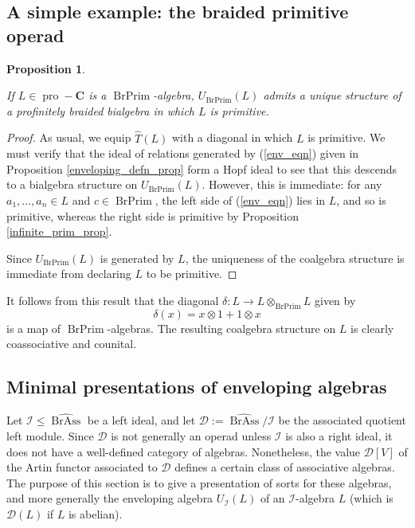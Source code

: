 \documentclass[12pt]{article}
\DeclareMathOperator{\pro}{pro}
\DeclareMathOperator{\BrAss}{BrAss}
\DeclareMathOperator{\BrPrim}{BrPrim}
\newcommand{\BrAsshat}{\widehat{\BrAss}} %
\newcommand{\That}{\widehat{T}}
\newcommand{\DD} {\mathcal{D}}
\newcommand{\bC} {\mathbf{C}}
\newcommand{\proC}{\pro\!-\bC}
\newcommand{\II}{\mathcal{I}}
\theoremstyle{plain}
\newtheorem{prop}[thm]{Proposition}
\theoremstyle{definition}
\theoremstyle{remark}
\begin{document}
\subsection{A simple example: the braided primitive operad}

\begin{prop} \label{universal_primitive_prop} 

If $L \in \proC$ is a $\BrPrim$-algebra, $U_{\BrPrim}(L)$ admits a unique structure of a profinitely braided bialgebra in which $L$ is primitive.  

\end{prop}

\begin{proof}

As usual, we equip $\That(L)$ with a diagonal in which $L$ is primitive.  We must verify that the ideal of relations generated by (\ref{env_eqn}) given in Proposition \ref{enveloping_defn_prop} form a Hopf ideal to see that this descends to a bialgebra structure on $U_{\BrPrim}(L)$.  However, this is immediate: for any $a_1, \dots, a_n \in L$ and $c \in \BrPrim$, the left side of (\ref{env_eqn}) lies in $L$, and so is primitive, whereas the right side is primitive by Proposition \ref{infinite_prim_prop}.

Since $U_{\BrPrim}(L)$ is generated by $L$, the uniqueness of the coalgebra structure is immediate from declaring $L$ to be primitive.

\end{proof}

It follows from this result that the diagonal $\delta:L \to L \otimes_{\BrPrim} L$ given by
%
$$\delta(x) = x \otimes 1 + 1 \otimes x$$
%
is a map of $\BrPrim$-algebras.  The resulting coalgebra structure on $L$ is clearly coassociative and counital. 


\subsection{Minimal presentations of enveloping algebras} 

Let $\II \leq \BrAsshat$ be a left ideal, and let $\DD:= \BrAsshat/\II$ be the associated quotient left module.  Since $\DD$ is not generally an operad unless $\II$ is also a right ideal, it does not have a well-defined category of algebras.  Nonetheless, the value $\DD[V]$ of the Artin functor associated to $\DD$ defines a certain class of associative algebras.  The purpose of this section is to give a presentation of sorts for these algebras, and more generally the enveloping algebra $U_{\II}(L)$ of an $\II$-algebra $L$ (which is $\DD(L)$ if $L$ is abelian).
\end{document}
